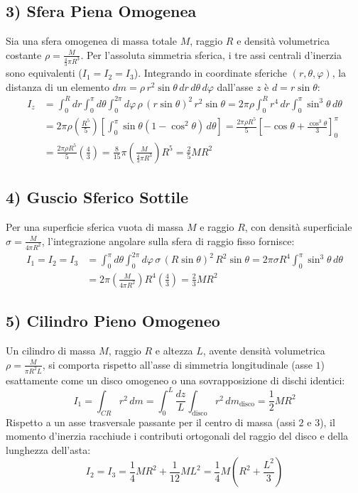 \subsection{3) Sfera Piena Omogenea}
Sia una sfera omogenea di massa totale $M$, raggio $R$ e densità volumetrica costante $\rho = \frac{M}{\frac{4}{3}\pi R^3}$. Per l'assoluta simmetria sferica, i tre assi centrali d'inerzia sono equivalenti ($I_1 = I_2 = I_3$).
Integrando in coordinate sferiche $(r, \theta, \varphi)$, la distanza di un elemento $dm = \rho \, r^2 \sin\theta \, dr \, d\theta \, d\varphi$ dall'asse $z$ è $d = r \sin\theta$:
\begin{align*}
    I_z &= \int_{0}^{R} dr \int_{0}^{\pi} d\theta \int_{0}^{2\pi} d\varphi \, \rho \, (r \sin\theta)^2 \, r^2 \sin\theta = 2\pi \rho \int_{0}^{R} r^4 \, dr \int_{0}^{\pi} \sin^3\theta \, d\theta \\
    &= 2\pi \rho \left( \frac{R^5}{5} \right) \left[ \int_{0}^{\pi} \sin\theta (1 - \cos^2\theta) \, d\theta \right] = \frac{2\pi \rho R^5}{5} \left[ -\cos\theta + \frac{\cos^3\theta}{3} \right]_0^\pi \\
    &= \frac{2\pi \rho R^5}{5} \left( \frac{4}{3} \right) = \frac{8}{15} \pi \left( \frac{M}{\frac{4}{3}\pi R^3} \right) R^5 = \frac{2}{5} M R^2
\end{align*}

\subsection{4) Guscio Sferico Sottile}
Per una superficie sferica vuota di massa $M$ e raggio $R$, con densità superficiale $\sigma = \frac{M}{4\pi R^2}$, l'integrazione angolare sulla sfera di raggio fisso fornisce:
\begin{align*}
    I_1 = I_2 = I_3 &= \int_{0}^{\pi} d\theta \int_{0}^{2\pi} d\varphi \, \sigma \, (R \sin\theta)^2 \, R^2 \sin\theta = 2\pi \sigma R^4 \int_{0}^{\pi} \sin^3\theta \, d\theta \\
    &= 2\pi \left( \frac{M}{4\pi R^2} \right) R^4 \left( \frac{4}{3} \right) = \frac{2}{3} M R^2
\end{align*}

\subsection{5) Cilindro Pieno Omogeneo}
Un cilindro di massa $M$, raggio $R$ e altezza $L$, avente densità volumetrica $\rho = \frac{M}{\pi R^2 L}$, si comporta rispetto all'asse di simmetria longitudinale (asse $1$) esattamente come un disco omogeneo o una sovrapposizione di dischi identici:
\begin{equation}
    I_1 = \int_{CR} r^2 \, dm = \int_{0}^{L} \frac{dz}{L} \int_{\text{disco}} r^2 \, dm_{\text{disco}} = \frac{1}{2} M R^2
\end{equation}
Rispetto a un asse trasversale passante per il centro di massa (assi $2$ e $3$), il momento d'inerzia racchiude i contributi ortogonali del raggio del disco e della lunghezza dell'asta:
\begin{equation}
    I_2 = I_3 = \frac{1}{4} M R^2 + \frac{1}{12} M L^2 = \frac{1}{4} M \left( R^2 + \frac{L^2}{3} \right)
\end{equation}

